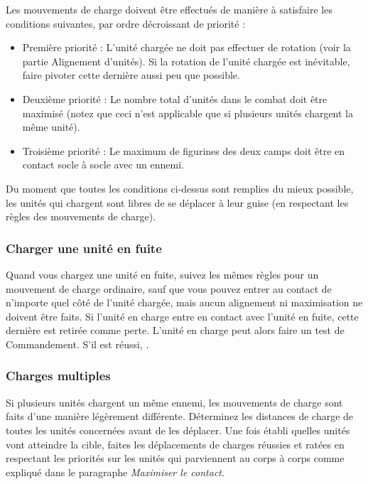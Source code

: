 Les mouvements de charge doivent être effectués de manière à satisfaire les conditions suivantes, par ordre décroissant de priorité :

\begin{itemize}[label={-}]
\item Première priorité : L'unité chargée ne doit pas effectuer de rotation (voir la partie Alignement d'unités). Si la rotation de l'unité chargée est inévitable, faire pivoter cette dernière aussi peu que possible.
\item Deuxième priorité : Le nombre total d'unités dans le combat doit être maximisé (notez que ceci n'est applicable que si plusieurs unités chargent la même unité).
\item Troisième priorité : Le maximum de figurines des deux camps doit être en contact socle à socle avec un ennemi.
\end{itemize}

Du moment que toutes les conditions ci-dessus sont remplies du mieux possible, les unités qui chargent sont libres de se déplacer à leur guise (en respectant les règles des mouvements de charge).


\subsubsection*{Charger une unité en fuite}

Quand vous chargez une unité en fuite, suivez les mêmes règles pour un mouvement de charge ordinaire, sauf que vous pouvez entrer au contact de n'importe quel côté de l'unité chargée, mais aucun alignement ni maximisation ne doivent être faits. Si l'unité en charge entre en contact avec l'unité en fuite, cette dernière est retirée comme perte. L'unité en charge peut alors faire un test de Commandement. S'il est réussi, .

\subsubsection*{Charges multiples}

Si plusieurs unités chargent un même ennemi, les mouvements de charge sont faits d'une manière légèrement différente. Déterminez les distances de charge de toutes les unités concernées avant de les déplacer. Une fois établi quelles unités vont atteindre la cible, faites les déplacements de charges réussies et ratées en respectant les priorités sur les unités qui parviennent au corps à corps comme expliqué dans le paragraphe \emph{Maximiser le contact}.

